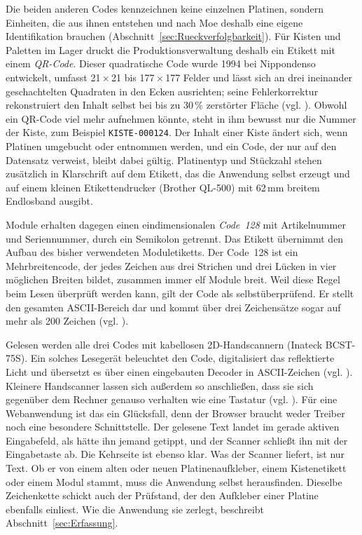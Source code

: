 Die beiden anderen Codes kennzeichnen keine einzelnen Platinen, sondern Einheiten,
die aus ihnen entstehen und nach Moe deshalb eine eigene Identifikation brauchen
(Abschnitt~\ref{sec:Rueckverfolgbarkeit}). Für
Kisten und Paletten im Lager druckt die Produktionsverwaltung deshalb ein
Etikett mit einem \emph{QR-Code}. Dieser quadratische Code wurde 1994 bei
Nippondenso entwickelt, umfasst 21\,$\times$\,21 bis 177\,$\times$\,177 Felder
und lässt sich an drei ineinander geschachtelten Quadraten in den Ecken
ausrichten; seine Fehlerkorrektur rekonstruiert den Inhalt selbst bei bis zu
30\,\% zerstörter Fläche (vgl. \cite[S.~83]{tenhompelIdentifikationssystemeUndAutomatisierung2008}).
Obwohl ein QR-Code viel mehr aufnehmen könnte, steht in ihm bewusst nur die
Nummer der Kiste, zum Beispiel \texttt{KISTE-000124}. Der Inhalt einer Kiste
ändert sich, wenn Platinen umgebucht oder entnommen werden, und ein Code, der nur
auf den Datensatz verweist, bleibt dabei gültig. Platinentyp und Stückzahl stehen
zusätzlich in Klarschrift auf dem Etikett, das die Anwendung selbst erzeugt und
auf einem kleinen Etikettendrucker (Brother QL-500) mit 62\,mm breitem
Endlosband ausgibt.

Module erhalten dagegen einen eindimensionalen \emph{Code~128} mit Artikelnummer
und Seriennummer, durch ein Semikolon getrennt. Das Etikett übernimmt den Aufbau
des bisher verwendeten Moduletiketts. Der Code~128 ist ein Mehrbreitencode, der
jedes Zeichen aus drei Strichen und drei Lücken in vier möglichen Breiten bildet,
zusammen immer elf Module breit. Weil diese Regel beim Lesen überprüft werden
kann, gilt der Code als selbstüberprüfend. Er stellt den gesamten ASCII-Bereich
dar und kommt über drei Zeichensätze sogar auf mehr als 200 Zeichen (vgl.
\cite[S.~45\,f.]{tenhompelIdentifikationssystemeUndAutomatisierung2008}).

Gelesen werden alle drei Codes mit kabellosen 2D-Handscannern (Inateck
BCST-75S). Ein solches Lesegerät beleuchtet den Code, digitalisiert das
reflektierte Licht und übersetzt es über einen eingebauten Decoder in
ASCII-Zeichen (vgl. \cite[S.~91\,f.]{tenhompelIdentifikationssystemeUndAutomatisierung2008}). Kleinere
Handscanner lassen sich außerdem so anschließen, dass sie sich gegenüber dem
Rechner genauso verhalten wie eine Tastatur (vgl.
\cite[S.~94]{tenhompelIdentifikationssystemeUndAutomatisierung2008}). Für eine Webanwendung ist das
ein Glücksfall, denn der Browser braucht weder Treiber noch eine besondere
Schnittstelle. Der gelesene Text landet im gerade aktiven Eingabefeld, als hätte
ihn jemand getippt, und der Scanner schließt ihn mit der Eingabetaste ab. Die
Kehrseite ist ebenso klar. Was der Scanner liefert, ist nur Text. Ob er von
einem alten oder neuen Platinenaufkleber, einem Kistenetikett oder einem Modul
stammt, muss die Anwendung selbst herausfinden. Dieselbe Zeichenkette schickt
auch der Prüfstand, der den Aufkleber einer Platine ebenfalls einliest.
Wie die Anwendung sie zerlegt, beschreibt Abschnitt~\ref{sec:Erfassung}.

